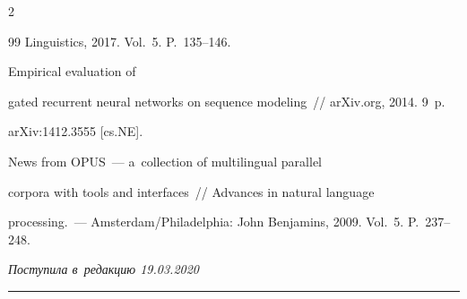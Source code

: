 \begin{multicols}{2}
{{\begin{thebibliography}{99}
Linguistics, 2017.  Vol.~5. P.~135--146.










 Empirical evaluation of 


gated recurrent neural networks on sequence modeling~// arXiv.org, 2014. 9~p.


arXiv:1412.3555 [cs.NE].







 News from OPUS~--- a~collection of multilingual parallel 


corpora with tools and interfaces~// Advances in natural language 


processing.~--- Amsterdam/Philadelphia: John Benjamins, 2009. Vol.~5. P.~237--248.


\end{thebibliography}





}


}





\end{multicols}





\vspace*{-3pt}





\hfill{\small\textit{Поступила в~редакцию 19.03.2020}}





\vspace*{8pt}




















\hrule





